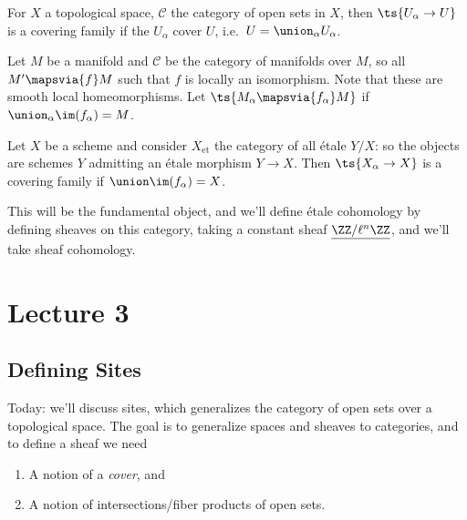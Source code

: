 \begin{example}[?]

For \(X\) a topological space, \(\mathcal{C}\) the category of open sets
in \(X\), then \(\ts{U_\alpha\to U}\) is a covering family if the
\(U_\alpha\) cover \(U\), i.e.~\(U = \union_\alpha U_\alpha\).

\end{example}

\begin{example}

Let \(M\) be a manifold and \(\mathcal{C}\) be the category of manifolds
over \(M\), so all \(M' \mapsvia{f} M\) such that \(f\) is locally an
isomorphism. Note that these are smooth local homeomorphisms. Let
\(\ts{M_\alpha \mapsvia{f_\alpha} M}\) if
\(\union_\alpha \im (f_\alpha) = M\).

\end{example}

\begin{example}

Let \(X\) be a scheme and consider \(X_{\text{et}}\) the category of all
étale \(Y/X\): so the objects are schemes \(Y\) admitting an étale
morphism \(Y\to X\). Then \(\ts{X_\alpha\to X}\) is a covering family if
\(\union \im (f_\alpha) = X\).

\end{example}

This will be the fundamental object, and we'll define étale cohomology
by defining sheaves on this category, taking a constant sheaf
\(\underline{\ZZ/\ell^n\ZZ}\), and we'll take sheaf cohomology.

\hypertarget{lecture-3}{%
\section{Lecture 3}\label{lecture-3}}

\hypertarget{defining-sites}{%
\subsection{Defining Sites}\label{defining-sites}}

Today: we'll discuss sites, which generalizes the category of open sets
over a topological space. The goal is to generalize spaces and sheaves
to categories, and to define a sheaf we need

\begin{enumerate}
\def\labelenumi{\arabic{enumi}.}
\item
  A notion of a \emph{cover}, and
\item
  A notion of intersections/fiber products of open sets.
\end{enumerate}

